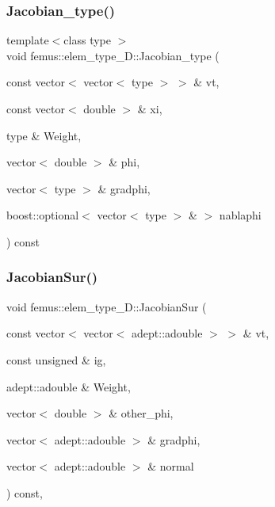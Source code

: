 \mbox{\label{classfemus_1_1elem__type__3_d_a8e2dffc8f5d0e5fa316b93218d331280}} 
\subsubsection{\texorpdfstring{Jacobian\+\_\+type()}{Jacobian\_type()}\hspace{0.1cm}{\footnotesize\ttfamily [2/2]}}
{\footnotesize\ttfamily template$<$class type $>$ \\
void femus\+::elem\+\_\+type\+\_\+D\+::\+Jacobian\+\_\+type (\begin{DoxyParamCaption}\item[{const vector$<$ vector$<$ type $>$ $>$ \&}]{vt,  }\item[{const vector$<$ double $>$ \&}]{xi,  }\item[{type \&}]{Weight,  }\item[{vector$<$ double $>$ \&}]{phi,  }\item[{vector$<$ type $>$ \&}]{gradphi,  }\item[{boost\+::optional$<$ vector$<$ type $>$ \& $>$}]{nablaphi }\end{DoxyParamCaption}) const}

\mbox{\label{classfemus_1_1elem__type__3_d_a8eea4f745f548cc10bb55848c4cd2ba3}} 
\subsubsection{\texorpdfstring{Jacobian\+Sur()}{JacobianSur()}\hspace{0.1cm}{\footnotesize\ttfamily [1/2]}}
{\footnotesize\ttfamily void femus\+::elem\+\_\+type\+\_\+D\+::\+Jacobian\+Sur (\begin{DoxyParamCaption}\item[{const vector$<$ vector$<$ adept\+::adouble $>$ $>$ \&}]{vt,  }\item[{const unsigned \&}]{ig,  }\item[{adept\+::adouble \&}]{Weight,  }\item[{vector$<$ double $>$ \&}]{other\+\_\+phi,  }\item[{vector$<$ adept\+::adouble $>$ \&}]{gradphi,  }\item[{vector$<$ adept\+::adouble $>$ \&}]{normal }\end{DoxyParamCaption}) const\hspace{0.3cm}{\ttfamily [inline]}, {\ttfamily [virtual]}}




